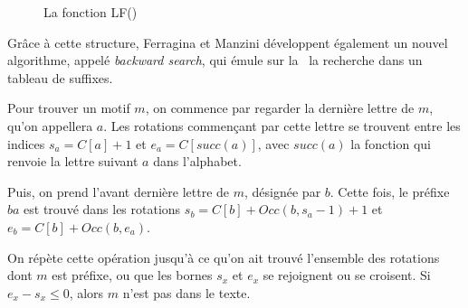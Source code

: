 \begin{figure}[h!]
\caption{La fonction LF()}
\label{lf} 
\end{figure}

Grâce à cette structure, Ferragina et Manzini développent également un nouvel algorithme, appelé \textit{backward search}, qui émule sur la \bwt\ la recherche dans un tableau de suffixes.

Pour trouver un motif $m$, on commence par regarder la dernière lettre de $m$, qu'on appellera $a$. Les rotations commençant par cette lettre se trouvent entre les indices $s_a = C[a] + 1$ et $e_a = C[succ(a)]$, avec $succ(a)$ la fonction qui renvoie la lettre suivant $a$ dans l'alphabet. 

Puis, on prend l'avant dernière lettre de $m$, désignée par $b$. Cette fois, le préfixe $ba$ est trouvé dans les rotations $s_b = C[b] + Occ(b, s_a-1) + 1$ et $e_b = C[b] + Occ(b, e_a)$.

On répète cette opération jusqu'à ce qu'on ait trouvé l'ensemble des rotations dont $m$ est préfixe, ou que les bornes $s_x$ et $e_x$ se rejoignent ou se croisent. Si $e_x - s_x \le 0$, alors $m$ n'est pas dans le texte.

